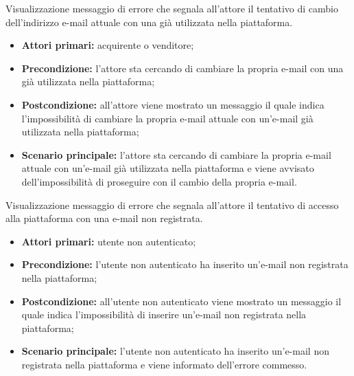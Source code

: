 \hypertarget{CambioEmailPresente}{}
Visualizzazione messaggio di errore che segnala all'attore il tentativo di cambio dell'indirizzo e-mail attuale con una già utilizzata nella piattaforma.
\begin{itemize}
    \item \textbf{Attori primari:} acquirente o venditore;
    \item \textbf{Precondizione:} l'attore sta cercando di cambiare la propria e-mail con una già utilizzata nella piattaforma;
    \item \textbf{Postcondizione:} all'attore viene mostrato un messaggio il quale indica l'impossibilità di cambiare la propria e-mail attuale con un'e-mail già utilizzata nella piattaforma;
    \item \textbf{Scenario principale:} l'attore sta cercando di cambiare la propria e-mail attuale con un'e-mail già utilizzata nella piattaforma e viene avvisato dell'impossibilità di proseguire con il cambio della propria e-mail.
\end{itemize}

\hypertarget{EmailNonRegistrata}{}
Visualizzazione messaggio di errore che segnala all'attore il tentativo di accesso alla piattaforma con una e-mail non registrata.
\begin{itemize}
    \item \textbf{Attori primari:} utente non autenticato;
    \item \textbf{Precondizione:} l'utente non autenticato ha inserito un'e-mail non registrata nella piattaforma;
    \item \textbf{Postcondizione:} all'utente non autenticato viene mostrato un messaggio il quale indica l'impossibilità di inserire un'e-mail non registrata nella piattaforma;
    \item \textbf{Scenario principale:} l'utente non autenticato ha inserito un'e-mail non registrata nella piattaforma e viene informato dell'errore commesso.
\end{itemize}

